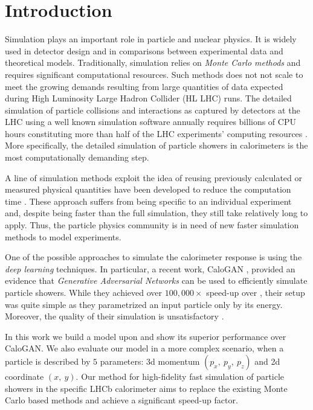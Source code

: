 \section{Introduction}

Simulation plays an important role in particle and nuclear physics. It is widely used in detector design and in comparisons between experimental data and theoretical models. Traditionally, simulation relies on \textit{Monte Carlo methods} and requires significant computational resources. Such methods does not not scale to meet the growing demands resulting from large quantities of data expected during High Luminosity Large Hadron Collider (HL LHC) runs. The detailed simulation of particle collisions and interactions as captured by detectors at the LHC using a well known simulation software \geant annually requires billions of CPU hours constituting more than half of the LHC experiments' computing resources \cite{bozzi2014, flynn2015computing}. More specifically, the detailed simulation of particle showers in calorimeters is the most computationally demanding step.
 
A line of simulation methods exploit the idea of reusing previously calculated or measured physical quantities have been developed to reduce the computation time \cite{grindhammer2000parameterized,atlas2010simulation}. These approach suffers from being specific to an individual experiment and, despite being faster than the full simulation, they still take relatively long to apply. Thus, the particle physics community is in need of new faster simulation methods to model experiments. 
    
One of the possible approaches to simulate the calorimeter response is using the \textit{deep learning} techniques. In particular, a recent work, CaloGAN \cite{paganini2017calogan}, provided an evidence that \textit{Generative Adversarial Networks} can be used to efficiently simulate particle showers. While they achieved over $100,000 \times$ speed-up over \geant, their setup was quite simple as they parametrized an input particle only by its energy. Moreover, the quality of their simulation is unsatisfactory . 

In this work we build a model upon  and show its superior performance over CaloGAN. We also evaluate our model in a more complex scenario, when a particle is described by $5$ parameters: 3d momentum $(p_x,~ p_y,~ p_z)$ and 2d coordinate $(x,~ y)$. Our method for high-fidelity fast simulation of particle showers in the specific LHCb calorimeter aims to replace the existing Monte Carlo based methods and achieve a significant speed-up factor.
 



